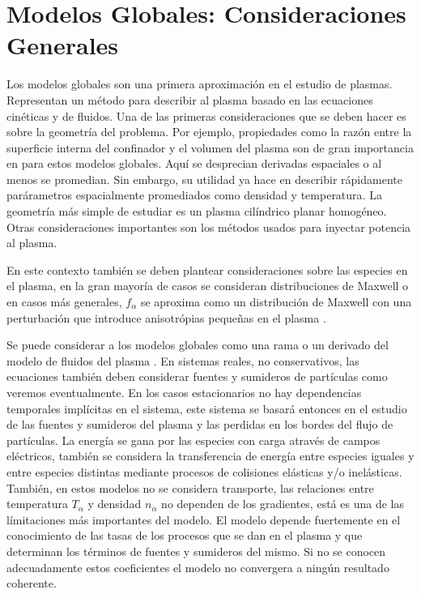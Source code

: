 \section{Modelos Globales: Consideraciones Generales}

Los modelos globales son una primera aproximaci\'on en el estudio de plasmas. Representan un m\'etodo para describir al plasma basado en las ecuaciones cin\'eticas y de fluidos. Una de las primeras consideraciones que se deben hacer es sobre la geometr\'ia del problema. Por ejemplo, propiedades como la raz\'on entre la superficie interna del confinador y el volumen del plasma son de gran importancia en para estos modelos globales. Aqu\'i se desprecian derivadas espaciales o al menos se promedian. Sin embargo, su utilidad ya hace en describir r\'apidamente par\'arametros espacialmente promediados como densidad y temperatura\cite{hurlbatt2017}. La geometr\'ia m\'as simple de estudiar es un plasma cil\'indrico planar homog\'eneo. Otras consideraciones importantes son los m\'etodos usados para inyectar potencia al plasma.

En este contexto tambi\'en se deben plantear consideraciones sobre las especies en el plasma, en la gran mayor\'ia de casos se consideran distribuciones de Maxwell o en casos m\'as generales, $f_\alpha$ se aproxima como un distribuci\'on de Maxwell con una perturbaci\'on que introduce anisotr\'opias pequeñas en el plasma \cite{alves2018}. 

Se puede considerar a los modelos globales como una rama o un derivado del modelo de fluidos del plasma \cite{hurlbatt2017}. En sistemas reales, no conservativos, las ecuaciones tambi\'en deben considerar fuentes y sumideros de part\'iculas como veremos eventualmente. En los casos estacionarios no hay dependencias temporales impl\'icitas en el sistema, este sistema se basar\'a entonces en el estudio de las fuentes y sumideros del plasma y las perdidas en los bordes del flujo de part\'iculas. La energ\'ia se gana por las especies con carga atrav\'es de campos el\'ectricos, tambi\'en se considera la transferencia de energ\'ia entre especies iguales y entre especies distintas mediante procesos de colisiones el\'asticas y/o inel\'asticas. Tambi\'en, en estos modelos no se considera transporte, las relaciones entre temperatura $T_\alpha$ y densidad $n_\alpha$ no dependen de los gradientes, est\'a es una de las l\'imitaciones m\'as importantes del modelo. El modelo depende fuertemente en el conocimiento de las tasas de los procesos que se dan en el plasma y que determinan los t\'erminos de fuentes y sumideros del mismo. Si no se conocen adecuadamente estos coeficientes el modelo no convergera a ning\'un resultado coherente. 

